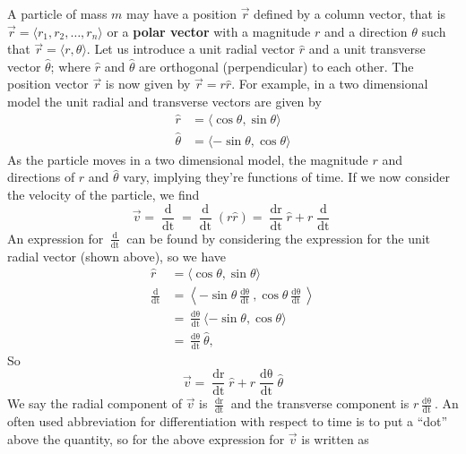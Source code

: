 A particle of mass $m$ may have a position $\vec{r}$ defined by a column vector, that is $\vec{r} = \langle r_1, r_2, \ldots, r_n \rangle$ or a \textbf{polar vector} with a magnitude $r$ and a direction $\theta$ such that $\vec{r} = \langle r, \theta \rangle$. Let us introduce a unit radial vector $\hat{r}$ and a unit transverse vector $\hat{\theta}$; where $\hat{r}$ and $\hat{\theta}$ are orthogonal (perpendicular) to each other. The position vector $\vec{r}$ is now given by $\vec{r} = r \hat{r}$. For example, in a two dimensional model the unit radial and transverse vectors are given by
\begin{align*}
    \hat{r} &= \langle \cos \theta, \sin \theta \rangle \\
    \hat{\theta} &= \langle - \sin \theta, \cos \theta \rangle
\end{align*}
As the particle moves in a two dimensional model, the magnitude $r$ and directions of $\hat{r}$ and $\hat{\theta}$ vary, implying they're functions of time. If we now consider the velocity of the particle, we find
\begin{equation}
    \vec{v} = \frac{\mathop{\mathrm{d} \vec{r}}}{\mathop{\mathrm{d} t}} = \frac{\mathop{\mathrm{d}}}{\mathop{\mathrm{d}t}}(r \hat{r}) = \frac{\mathop{\mathrm{d}r}}{\mathop{\mathrm{d} t}} \hat{r} + r \frac{\mathop{\mathrm{d} \hat{r}}}{\mathop{\mathrm{d} t}}
\end{equation}
An expression for $\frac{\mathop{\mathrm{d} \hat{r}}}{\mathop{\mathrm{d} t}}$ can be found by considering the expression for the unit radial vector (shown above), so we have
\begin{align*}
    \hat{r} &= \langle \cos \theta, \sin \theta \rangle \\
    \frac{\mathop{\mathrm{d} \hat{r}}}{\mathop{\mathrm{d} t}} &= \left\langle - \sin \theta \frac{\mathop{\mathrm{d} \theta}}{\mathop{\mathrm{d}t}}, \cos \theta \frac{\mathop{\mathrm{d} \theta}}{\mathop{\mathrm{d} t}}\right\rangle \\
    &= \frac{\mathop{\mathrm{d} \theta}}{\mathop{\mathrm{d}t}} \langle -\sin \theta, \cos \theta \rangle \\
    &= \frac{\mathop{\mathrm{d} \theta}}{\mathop{\mathrm{d}t}} \hat{\theta},
\end{align*}
So 
\begin{equation}
    \vec{v} = \frac{\mathop{\mathrm{d}r}}{\mathop{\mathrm{d} t}} \hat{r} + r \frac{\mathop{\mathrm{d} \theta}}{\mathop{\mathrm{d} t}} \hat{\theta}
\end{equation}
We say the radial component of $\vec{v}$ is $\frac{\mathop{\mathrm{d}r}}{\mathop{\mathrm{d} t}}$ and the transverse component is $r \frac{\mathop{\mathrm{d} \theta}}{\mathop{\mathrm{d} t}}$. An often used abbreviation for differentiation with respect to time is to put a ``dot'' above the quantity, so for the above expression for $\vec{v}$ is written as
